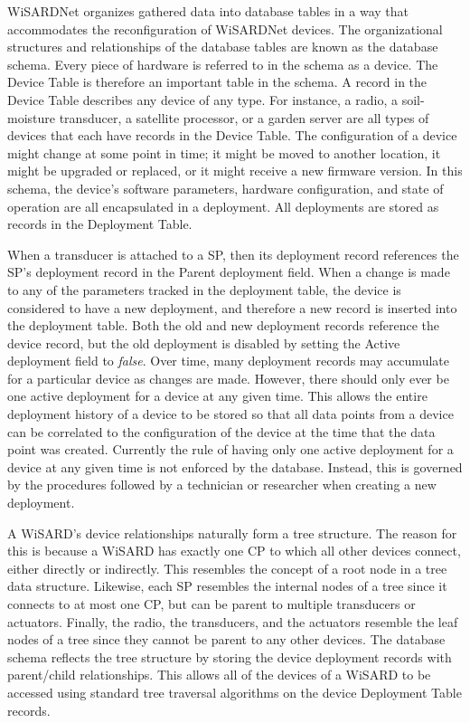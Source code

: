 WiSARDNet organizes gathered data into database tables in a way that accommodates the reconfiguration of WiSARDNet devices. The organizational structures and relationships of the database tables are known as the database schema. Every piece of hardware is referred to in the schema as a device. The Device Table is therefore an important table in the schema. A record in the Device Table describes any device of any type. For instance, a radio, a soil-moisture transducer, a satellite processor, or a garden server are all types of devices that each have records in the Device Table. The configuration of a device might change at some point in time; it might be moved to another location, it might be upgraded or replaced, or it might receive a new firmware version. In this schema, the device's software parameters, hardware configuration, and state of operation are all encapsulated in a deployment. All deployments are stored as records in the Deployment Table.

When a transducer is attached to a SP, then its deployment record references the SP's deployment record in the Parent deployment field. When a change is made to any of the parameters tracked in the deployment table, the device is considered to have a new deployment, and therefore a new record is inserted into the deployment table. Both the old and new deployment records reference the device record, but the old deployment is disabled by setting the Active deployment field to \textit{false}. Over time, many deployment records may accumulate for a particular device as changes are made. However, there should only ever be one active deployment for a device at any given time. This allows the entire deployment history of a device to be stored so that all data points from a device can be correlated to the configuration of the device at the time that the data point was created. Currently the rule of having only one active deployment for a device at any given time is not enforced by the database. Instead, this is governed by the procedures followed by a technician or researcher when creating a new deployment.

A WiSARD's device relationships naturally form a tree structure. The reason for this is because a WiSARD has exactly one CP to which all other devices connect, either directly or indirectly. This resembles the concept of a root node in a tree data structure. Likewise, each SP resembles the internal nodes of a tree since it connects to at most one CP, but can be parent to multiple transducers or actuators. Finally, the radio, the transducers, and the actuators resemble the leaf nodes of a tree since they cannot be parent to any other devices. The database schema reflects the tree structure by storing the device deployment records with parent/child relationships. This allows all of the devices of a WiSARD to be accessed using standard tree traversal algorithms on the device Deployment Table records.

